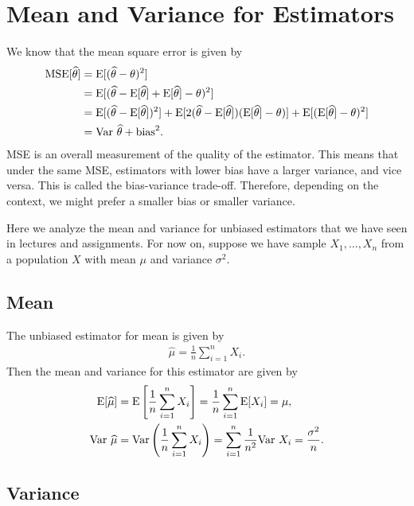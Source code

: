 \section*{Mean and Variance for Estimators}

We know that the mean square error is given by
\begin{align*}
\mathrm{MSE}[\widehat{\theta}] & = \mathrm{E}[(\widehat{\theta} - \theta)^2] \\
& = \mathrm{E}[(\widehat{\theta} - \mathrm{E}[\widehat{\theta}] + \mathrm{E}[\widehat{\theta}] - \theta)^2] \\
& = \mathrm{E}[(\widehat{\theta} - \mathrm{E}[\widehat{\theta}])^2] + \mathrm{E}[2(\widehat{\theta} - \mathrm{E}[\widehat{\theta}])(\mathrm{E}[\widehat{\theta}] - \theta)] + \mathrm{E}[(\mathrm{E}[\widehat{\theta}] - \theta)^2] \\
& = \mathrm{Var}\ \widehat{\theta} + \mathrm{bias}^2.
\end{align*}
MSE is an overall measurement of the quality of the estimator. This means that under the same MSE, estimators with lower bias have a larger variance, and vice versa. This is called the bias-variance trade-off. Therefore, depending on the context, we might prefer a smaller bias or smaller variance.

Here we analyze the mean and variance for unbiased estimators that we have seen in lectures and assignments. For now on, suppose we have sample $X_1, \ldots, X_n$ from a population $X$ with mean $\mu$ and variance $\sigma^2$.

\subsection*{Mean}

The unbiased estimator for mean is given by
\begin{align*}
\widehat{\mu} = \frac{1}{n}\sum_{i=1}^n X_i.
\end{align*}
Then the mean and variance for this estimator are given by
\begin{align*}
\mathrm{E}[\widehat{\mu}] & = \mathrm{E}\left[\frac{1}{n}\sum_{i=1}^n X_i \right] = \frac{1}{n}\sum_{i=1}^n \mathrm{E}[X_i] = \mu, \\
\mathrm{Var}\ \widehat{\mu} & = \mathrm{Var}\left(\frac{1}{n}\sum_{i=1}^n X_i \right) = \sum_{i=1}^n \frac{1}{n^2} \mathrm{Var}\ X_i = \frac{\sigma^2}{n}.
\end{align*}

\subsection*{Variance}

